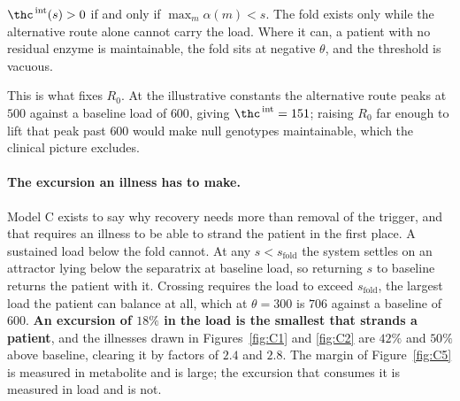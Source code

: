 \begin{corollary}
\label{cor:fold}
$\thc^{\,\mathrm{int}}(s) > 0$ if and only if $\max_m \alpha(m) < s$. The fold exists only
while the alternative route alone cannot carry the load. Where it can, a patient with no
residual enzyme is maintainable, the fold sits at negative $\theta$, and the threshold is
vacuous.
\end{corollary}

This is what fixes $R_0$. At the illustrative constants the alternative route peaks at $500$
against a baseline load of $600$, giving $\thc^{\,\mathrm{int}} = 151$; raising $R_0$ far
enough to lift that peak past $600$ would make null genotypes maintainable, which the
clinical picture excludes.

\paragraph{The excursion an illness has to make.} Model C exists to say why recovery needs
more than removal of the trigger, and that requires an illness to be able to strand the
patient in the first place. A sustained load below the fold cannot. At any
$s < s_{\mathrm{fold}}$ the system settles on an attractor lying below the separatrix at
baseline load, so returning $s$ to baseline returns the patient with it. Crossing requires
the load to exceed $s_{\mathrm{fold}}$, the largest load the patient can balance at all,
which at $\theta = 300$ is $706$ against a baseline of $600$. \textbf{An excursion of
$18\%$ in the load is the smallest that strands a patient}, and the illnesses drawn in
Figures~\ref{fig:C1} and \ref{fig:C2} are $42\%$ and $50\%$ above baseline, clearing it by
factors of $2.4$ and $2.8$. The margin of Figure~\ref{fig:C5} is measured in metabolite and
is large; the excursion that consumes it is measured in load and is not.

